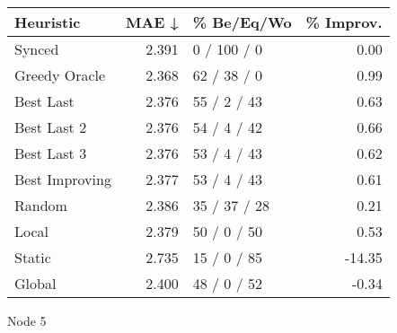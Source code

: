 \begin{tabular}{lrlr}
\toprule
\textbf{Heuristic} & \textbf{MAE ↓} & \textbf{\% Be/Eq/Wo} & \textbf{\% Improv.} \\
\midrule
            Synced &          2.391 &          0 / 100 / 0 &                0.00 \\
     Greedy Oracle &          2.368 &          62 / 38 / 0 &                0.99 \\
         Best Last &          2.376 &          55 / 2 / 43 &                0.63 \\
       Best Last 2 &          2.376 &          54 / 4 / 42 &                0.66 \\
       Best Last 3 &          2.376 &          53 / 4 / 43 &                0.62 \\
    Best Improving &          2.377 &          53 / 4 / 43 &                0.61 \\
            Random &          2.386 &         35 / 37 / 28 &                0.21 \\
             Local &          2.379 &          50 / 0 / 50 &                0.53 \\
            Static &          2.735 &          15 / 0 / 85 &              -14.35 \\
            Global &          2.400 &          48 / 0 / 52 &               -0.34 \\
\bottomrule
\end{tabular}
\caption{Node 5}
\label{tab:ds_iid_lr01_le1_bs4_5}
